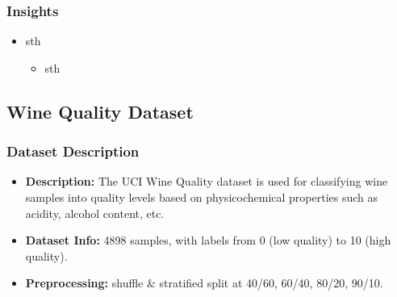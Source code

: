\subsubsection*{Insights}
\begin{itemize}
	\item sth
	      \begin{itemize}
		      \item sth
	      \end{itemize}
\end{itemize}

\clearpage
\subsection{Wine Quality Dataset}
\subsubsection*{Dataset Description}
\begin{itemize}
	\item \textbf{Description:} The UCI Wine Quality dataset is used for classifying wine samples into quality levels based on physicochemical properties such as acidity, alcohol content, etc.
	\item \textbf{Dataset Info:} 4898 samples, with labels from 0 (low quality) to 10 (high quality).
	\item \textbf{Preprocessing:} shuffle \& stratified split at 40/60, 60/40, 80/20, 90/10.
\end{itemize}

